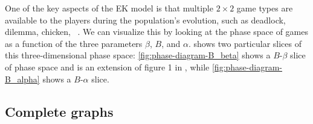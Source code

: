 \documentclass[pdflatex,twocolumn,sn-nature,super]{sn-jnl}
\begin{document}
One of the key aspects of the EK model
is that multiple $2 \times 2$ game types
are available to the players during the population's evolution,
such as deadlock, dilemma, chicken,
\etc{}~\citep{bruns2015names}.
We can visualize this by looking at the phase space of games
as a function of the three parameters $\beta$, $B$, and $\alpha$.
 shows two particular slices
of this three-dimensional phase space:
\cref{fig:phase-diagram-B_beta} shows a $B$-$\beta$ slice of phase space
and is an extension of figure 1 in \tripp{},
while \cref{fig:phase-diagram-B_alpha} shows a $B$-$\alpha$ slice.



\subsection{Complete graphs}\label{sec:complete_graph}
\end{document}

